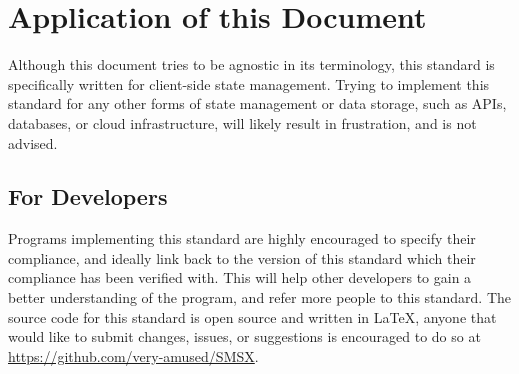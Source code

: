 \documentclass{article}
\begin{document}
\newpage
\section{Application of this Document}
Although this document tries to be agnostic in its terminology, this standard is specifically written for client-side state management. Trying to implement this standard for any other forms of state management or data storage, such as APIs, databases, or cloud infrastructure, will likely result in frustration, and is not advised. 

\subsection{For Developers}
Programs implementing this standard are highly encouraged to specify their compliance, and ideally link back to the version of this standard which their compliance has been verified with. This will help other developers to gain a better understanding of the program, and refer more people to this standard. The source code for this standard is open source and written in \LaTeX{}, anyone that would like to submit changes, issues, or suggestions is encouraged to do so at \url{https://github.com/very-amused/SMSX}.
\end{document}
